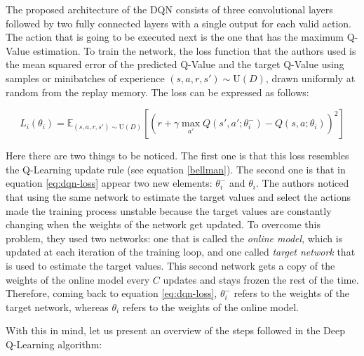 \documentclass{article}
\begin{document}
The proposed architecture of the DQN consists of three convolutional layers followed by two
fully connected layers with a single output for each valid action. The action that is going to be
executed next is the one that has the maximum Q-Value estimation. To train the network, the
loss function that the authors used is the mean squared error of the predicted Q-Value and the target
Q-Value using samples or minibatches of experience $(s, a, r, s') \sim \text{U}(D)$, drawn uniformly
at random from the replay memory. The loss can be expressed as follows:

\begin{equation}
  \label{eq:dqn-loss}
  L_i(\theta_i) = \mathbb{E}_{(s, a, r, s') \sim \text{U}(D)} \left[ \left( r + \gamma \max_{a'}Q(s', a';\theta_i^-) - Q(s, a; \theta_i) \right)^2 \right]
\end{equation}

Here there are two things to be noticed. The first one is that this loss resembles the Q-Learning
update rule (see equation \eqref{bellman}). The second one is that in equation \eqref{eq:dqn-loss}
appear two new elements: $\theta_i^-$ and $\theta_i$. The authors noticed that using the same network
to estimate the target values and select the actions made the training process unstable because
the target values are constantly changing when the weights of the network get updated. To overcome
this problem, they used two networks: one that is called the \emph{online model}, which is
updated at each iteration of the training loop, and one called \emph{target network} that is used
to estimate the target values. This second network gets a copy of the weights of the online model
every $C$ updates and stays frozen the rest of the time. Therefore, coming back to equation
\eqref{eq:dqn-loss}, $\theta_i^-$ refers to the weights of the target network, whereas $\theta_i$
refers to the weights of the online model.

With this in mind, let us present an overview of the steps followed in the Deep Q-Learning algorithm:
\end{document}
